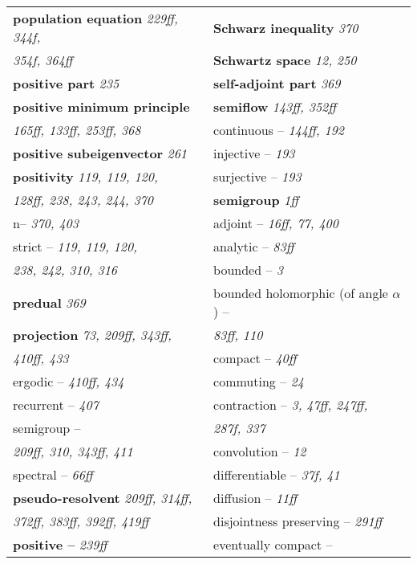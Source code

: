 \documentclass{article}
\begin{document}
\begin{longtable}{p{}p{}}
\textbf{population equation} \textit{229ff, 344f,} & \textbf{Schwarz inequality} \textit{370} \\
\quad \textit{354f, 364ff} & \textbf{Schwartz space} \textit{12, 250} \\
\textbf{positive part} \textit{235} & \textbf{self-adjoint part} \textit{369} \\
\textbf{positive minimum principle} & \textbf{semiflow} \textit{143ff, 352ff} \\
\quad \textit{165ff, 133ff, 253ff, 368} & \quad continuous -- \textit{144ff, 192} \\
\textbf{positive subeigenvector} \textit{261} & \quad injective -- \textit{193} \\
\textbf{positivity} \textit{119, 119, 120,} & \quad surjective -- \textit{193} \\
\quad \textit{128ff, 238, 243, 244, 370} & \textbf{semigroup} \textit{1ff} \\
\quad n-- \textit{370, 403} & \quad adjoint -- \textit{16ff, 77, 400} \\
\quad strict -- \textit{119, 119, 120,} & \quad analytic -- \textit{83ff} \\
\quad\quad \textit{238, 242, 310, 316} & \quad bounded -- \textit{3} \\
\textbf{predual} \textit{369} & \quad bounded holomorphic (of angle $ \alpha $) -- \\
\textbf{projection} \textit{73, 209ff, 343ff,} & \quad\quad \textit{83ff, 110} \\
\quad \textit{410ff, 433} & \quad compact -- \textit{40ff} \\
\quad ergodic -- \textit{410ff, 434} & \quad commuting -- \textit{24} \\
\quad recurrent -- \textit{407} & \quad contraction -- \textit{3, 47ff, 247ff,} \\
\quad semigroup -- & \quad\quad \textit{287f, 337} \\
\quad\quad \textit{209ff, 310, 343ff, 411} & \quad convolution -- \textit{12} \\
\quad spectral -- \textit{66ff} & \quad differentiable -- \textit{37f, 41} \\
\textbf{pseudo-resolvent} \textit{209ff, 314ff,} & \quad diffusion -- \textit{11ff} \\
\quad \textit{372ff, 383ff, 392ff, 419ff} & \quad disjointness preserving -- \textit{291ff} \\
\textbf{positive --} \textit{239ff} & \quad eventually compact -- \\

\end{longtable}
\end{document}
